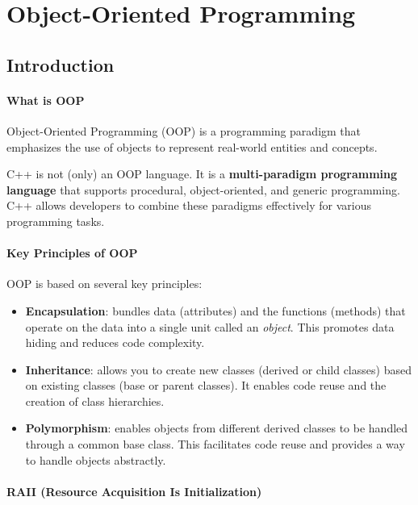 
\chapter{Object-Oriented Programming}

\section{Introduction}
\subsubsection{What is OOP}

Object-Oriented Programming (OOP) is a programming paradigm that emphasizes the use of objects to represent real-world entities and concepts.

\begin{definitionblock}[OOP in C++]
    C++ is not (only) an OOP language. It is a \textbf{multi-paradigm programming language} that supports procedural, object-oriented, and generic programming. 
    C++ allows developers to combine these paradigms effectively for various programming tasks.
\end{definitionblock}

\subsubsection{Key Principles of OOP}

OOP is based on several key principles:

\begin{itemize}
    \item \textbf{Encapsulation}: bundles data (attributes) and the functions (methods) that operate on the data into a single unit called an \textit{object}. This promotes data hiding and reduces code complexity.
    \item \textbf{Inheritance}: allows you to create new classes (derived or child classes) based on existing classes (base or parent classes). It enables code reuse and the creation of class hierarchies.
    \item \textbf{Polymorphism}: enables objects from different derived classes to be handled through a common base class. This facilitates code reuse and provides a way to handle objects abstractly.
\end{itemize}

\subsubsection{RAII (Resource Acquisition Is Initialization)}

